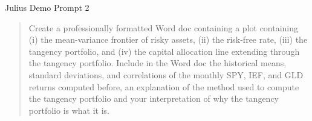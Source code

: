 \documentclass{beamer}
\begin{document}
\begin{frame}{Julius Demo Prompt 2}
   \begin{quote}
   Create a professionally formatted Word doc containing a plot containing (i) the mean-variance frontier of risky assets, (ii) the risk-free rate, (iii) the tangency portfolio, and (iv) the capital allocation line extending through the tangency portfolio.  Include in the Word doc the historical means, standard deviations, and correlations of the monthly SPY, IEF, and GLD returns computed before, an explanation of the method used to compute the tangency portfolio and your interpretation of why the tangency portfolio is what it is.

   \end{quote}
\end{frame}
\end{document}
